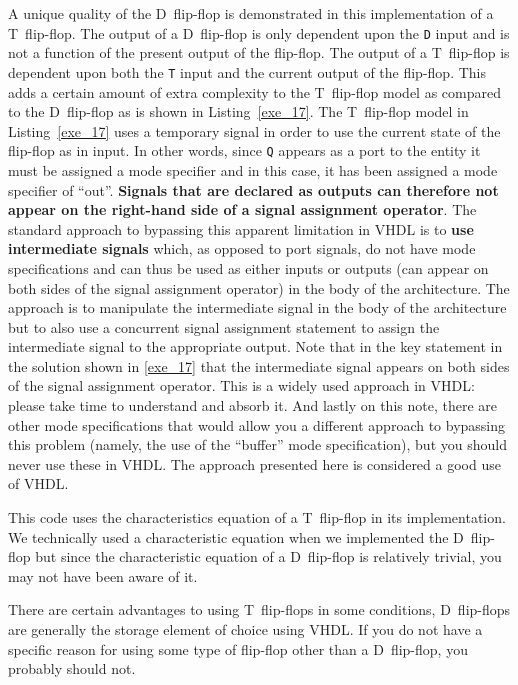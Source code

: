\begin{my_list}
\item A unique quality of the D~flip-flop is demonstrated in this implementation of a T~flip-flop. The output of a D~flip-flop is only dependent upon the \texttt{D} input and is not a function of the present output of the flip-flop. The output of a T~flip-flop is dependent upon both the \texttt{T} input and the current output of the flip-flop. This adds a certain amount of extra complexity to the T~flip-flop model as compared to the D~flip-flop as is shown in Listing~\ref{exe_17}. The T~flip-flop model in Listing~\ref{exe_17} uses a temporary signal in order to use the current state of the flip-flop as in input. In other words, since \texttt{Q} appears as a port to the entity it must be assigned a mode specifier and in this case, it has been assigned a mode specifier of ``out''. \textbf{Signals that are declared as outputs can therefore not appear on the right-hand side of a signal assignment operator}. The standard approach to bypassing this apparent limitation in VHDL is to \textbf{use intermediate signals} which, as opposed to port signals, do not have mode specifications and can thus be used as either inputs or outputs (can appear on both sides of the signal assignment operator) in the body of the architecture. The approach is to manipulate the intermediate signal in the body of the architecture but to also use a concurrent signal assignment statement to assign the intermediate signal to the appropriate output. Note that in the key statement in the solution shown in \ref{exe_17} that the intermediate signal appears on both sides of the signal assignment operator. This is a widely used approach in VHDL: please take time to understand and absorb it. And lastly on this note, there are other mode specifications that would allow you a different approach to bypassing this problem (namely, the use of the ``buffer'' mode specification), but you should never use these in VHDL. The approach presented here is considered a good use of VHDL. 

\item This code uses the characteristics equation of a T~flip-flop in its implementation. We technically used a characteristic equation when we implemented the D~flip-flop but since the characteristic equation of a D~flip-flop is relatively trivial, you may not have been aware of it.
\item There are certain advantages to using T~flip-flops in some conditions, D~flip-flops are generally the storage element of choice using VHDL. If you do not have a specific reason for using some type of flip-flop other than a D~flip-flop, you probably should not. 
\end{my_list}

